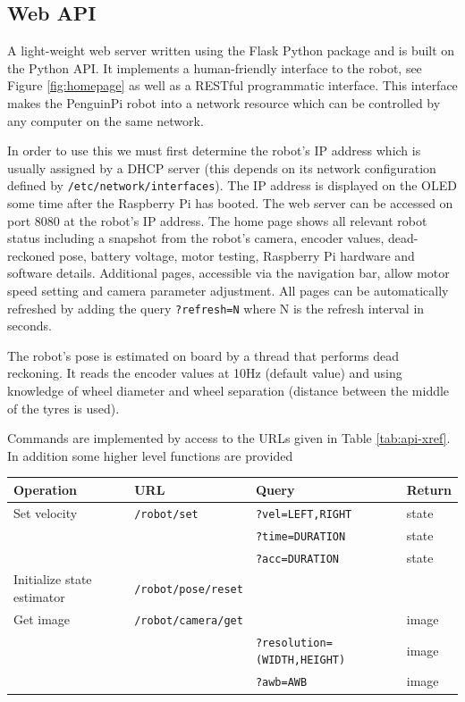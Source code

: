 \documentclass[11pt,fleqn]{article}
\begin{document}
\subsection{Web API}
A light-weight web server written using the Flask Python package and is built on the Python API.
It implements  a human-friendly interface to the robot, see Figure \ref{fig:homepage}  as well as a
 RESTful programmatic interface. 
This interface  makes the PenguinPi robot into a network resource which can be controlled
 by any computer on the same network.
 
 In order to use this we must first determine the robot's IP address which is usually assigned by a DHCP server (this depends on its network configuration defined by \texttt{/etc/network/interfaces}).  
 The IP address is displayed on the OLED some time after the Raspberry Pi
has booted.
The web server can be accessed on port 8080 at the robot's IP address.  The home page shows all relevant robot status including 
a snapshot from the robot's camera, encoder values, dead-reckoned pose, battery voltage, motor testing, Raspberry Pi hardware and software details. 
Additional pages, accessible via the navigation bar, allow motor speed setting and camera parameter adjustment.
All pages can be automatically refreshed by adding the query \texttt{?refresh=N} where N is the refresh interval in seconds.

The robot's pose is estimated on board by a thread that performs dead reckoning.  It reads the encoder values at 10\unit{Hz} (default value) and using knowledge of wheel
diameter and wheel separation (distance between the middle of the tyres is used).


Commands are implemented by access to the URLs given in Table \ref{tab:api-xref}.  In addition some higher level functions are provided

\begin{tabular}{|l|l|l|l|} \hline
Operation & URL & Query & Return \\\hline\hline
Set velocity & \texttt{/robot/set} & \texttt{?vel=LEFT,RIGHT} & state \\
 &                      & \texttt{?time=DURATION}  & state\\
 &                      & \texttt{?acc=DURATION} & state \\
Initialize state estimator & \texttt{/robot/pose/reset}   &  &\\
Get image & \texttt{/robot/camera/get} & & image \\
 & &                  \texttt{?resolution=(WIDTH,HEIGHT)} & image \\
 &  &                 \texttt{?awb=AWB} & image\\\hline
\end{tabular}
\end{document}
